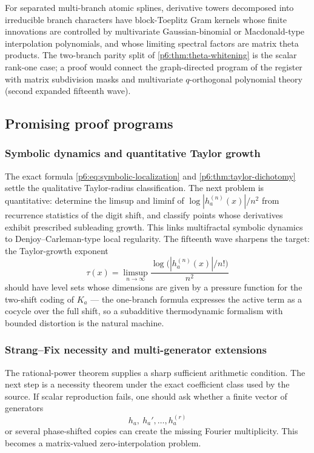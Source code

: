 \documentclass[11pt,oneside]{article}
\numberwithin{equation}{section}
\theoremstyle{definition}
\theoremstyle{remark}
\begin{document}
\begin{conjecture}
\label{p6:conj:graph-prediction}
For separated multi-branch atomic splines, derivative towers decomposed
into irreducible branch characters have block-Toeplitz Gram kernels whose
finite innovations are controlled by multivariate Gaussian-binomial or
Macdonald-type interpolation polynomials, and whose limiting spectral
factors are matrix theta products.  The two-branch parity split of
\cref{p6:thm:theta-whitening} is the scalar rank-one case; a proof would
connect the graph-directed program of the register with matrix
subdivision masks and multivariate $q$-orthogonal polynomial theory
(second expanded fifteenth wave).
\end{conjecture}

\subsection{Promising proof programs}

\subsubsection{Symbolic dynamics and quantitative Taylor growth}
The exact formula \eqref{p6:eq:symbolic-localization} and
\cref{p6:thm:taylor-dichotomy} settle the qualitative Taylor-radius classification.
The next problem is quantitative: determine the limsup and liminf of
$\log|h_a^{(n)}(x)|/n^2$ from recurrence statistics of the digit shift, and
classify points whose derivatives exhibit prescribed subleading growth.  This
links multifractal symbolic dynamics to Denjoy--Carleman-type local regularity.
The fifteenth wave sharpens the target: the Taylor-growth exponent
\[
 \tau(x)=\limsup_{n\to\infty}
 \frac{\log\bigl(|h_a^{(n)}(x)|/n!\bigr)}{n^2}
\]
should have level sets whose dimensions are given by a pressure function for
the two-shift coding of $K_a$ --- the one-branch formula expresses the active
term as a cocycle over the full shift, so a subadditive thermodynamic
formalism with bounded distortion is the natural machine.

\subsubsection{Strang--Fix necessity and multi-generator extensions}
The rational-power theorem supplies a sharp sufficient arithmetic condition.
The next step is a necessity theorem under the exact coefficient class used by
the source.  If scalar reproduction fails, one should ask whether a finite
vector of generators
\[
 h_a,\ h_a',\ldots,h_a^{(r)}
\]
or several phase-shifted copies can create the missing Fourier multiplicity.
This becomes a matrix-valued zero-interpolation problem.
\end{document}
